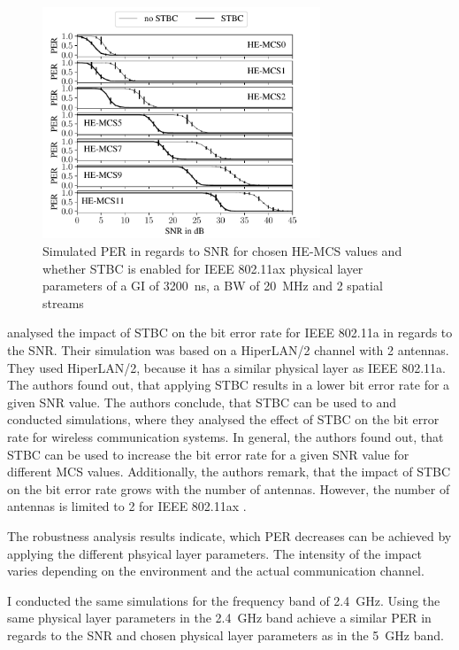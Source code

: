 \begin{figure}%
	\centering
	\includegraphics[width=0.74\textwidth]{figures/STBC_PER_to_SNR.pdf}
	\caption{Simulated \ac{PER} in regards to \ac{SNR} for chosen HE-\ac{MCS} values and whether \ac{STBC} is enabled for IEEE 802.11ax physical layer parameters of a \ac{GI} of \SI{3200}{\nano\second}, a \ac{BW} of \SI{20}{\mega\hertz} and 2 spatial streams}%
	\label{fig:PER_SNR_STBC}%
\end{figure}
\textcite{stamoulis_impact_2003} analysed the impact of \ac{STBC} on the bit error rate for IEEE 802.11a in regards to the \ac{SNR}. Their simulation was based
on a HiperLAN/2 channel with \num{2} antennas. They used HiperLAN/2, because it has a similar physical layer as IEEE 802.11a.
The authors found out, that applying \ac{STBC} results in a lower bit error rate for a given \ac{SNR} value. The authors conclude, that \ac{STBC} can be used to
\textcite{santumon_space-time_2012} and \textcite{tarokh_space-time_1999} conducted simulations, where they analysed the effect of \ac{STBC} on the bit error rate for
wireless communication systems. In general, the authors found out, that \ac{STBC} can be used to increase the bit error rate for a given \ac{SNR} value for different
\ac{MCS} values. Additionally, the authors remark, that the impact of \ac{STBC} on the bit error rate grows with the number of antennas.
However, the number of antennas is limited to \num{2} for IEEE 802.11ax \cite{noauthor_ieee_2021}.

The robustness analysis results indicate, which \ac{PER} decreases can be achieved by applying the different phsyical layer parameters.
The intensity of the impact varies depending on the environment and the actual communication channel.

I conducted the same simulations for the frequency band of \SI{2.4}{\giga\hertz}. Using the same physical layer parameters in
the \SI{2.4}{\giga\hertz} band achieve a similar \ac{PER} in regards to the \ac{SNR} and chosen physical layer parameters
as in the \SI{5}{\giga\hertz} band.

